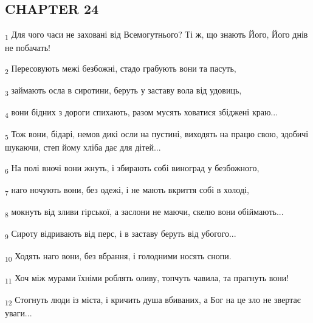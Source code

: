 \subsection{CHAPTER 24}
\begin{tcolorbox}
\textsubscript{1} Для чого часи не заховані від Всемогутнього? Ті ж, що знають Його, Його днів не побачать!
\end{tcolorbox}
\begin{tcolorbox}
\textsubscript{2} Пересовують межі безбожні, стадо грабують вони та пасуть,
\end{tcolorbox}
\begin{tcolorbox}
\textsubscript{3} займають осла в сиротини, беруть у заставу вола від удовиць,
\end{tcolorbox}
\begin{tcolorbox}
\textsubscript{4} вони бідних з дороги спихають, разом мусять ховатися збіджені краю...
\end{tcolorbox}
\begin{tcolorbox}
\textsubscript{5} Тож вони, бідарі, немов дикі осли на пустині, виходять на працю свою, здобичі шукаючи, степ йому хліба дає для дітей...
\end{tcolorbox}
\begin{tcolorbox}
\textsubscript{6} На полі вночі вони жнуть, і збирають собі виноград у безбожного,
\end{tcolorbox}
\begin{tcolorbox}
\textsubscript{7} наго ночують вони, без одежі, і не мають вкриття собі в холоді,
\end{tcolorbox}
\begin{tcolorbox}
\textsubscript{8} мокнуть від зливи гірської, а заслони не маючи, скелю вони обіймають...
\end{tcolorbox}
\begin{tcolorbox}
\textsubscript{9} Сироту відривають від перс, і в заставу беруть від убогого...
\end{tcolorbox}
\begin{tcolorbox}
\textsubscript{10} Ходять наго вони, без вбрання, і голодними носять снопи.
\end{tcolorbox}
\begin{tcolorbox}
\textsubscript{11} Хоч між мурами їхніми роблять оливу, топчуть чавила, та прагнуть вони!
\end{tcolorbox}
\begin{tcolorbox}
\textsubscript{12} Стогнуть люди із міста, і кричить душа вбиваних, а Бог на це зло не звертає уваги...
\end{tcolorbox}
